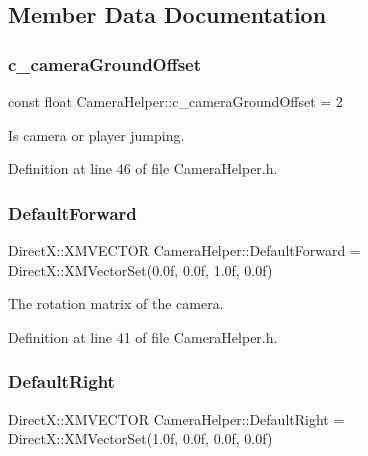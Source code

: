 \subsection{Member Data Documentation}
\mbox{\label{class_camera_helper_ac0b6f1a7975e28a7604985da3f29278b}} 
\subsubsection{\texorpdfstring{c\+\_\+camera\+Ground\+Offset}{c\_cameraGroundOffset}}
{\footnotesize\ttfamily const float Camera\+Helper\+::c\+\_\+camera\+Ground\+Offset = 2\hspace{0.3cm}{\ttfamily [private]}}



Is camera or player jumping. 



Definition at line 46 of file Camera\+Helper.\+h.

\mbox{\label{class_camera_helper_a4f5d97db4f91d138f5ea4bf4416df132}} 
\subsubsection{\texorpdfstring{Default\+Forward}{DefaultForward}}
{\footnotesize\ttfamily Direct\+X\+::\+X\+M\+V\+E\+C\+T\+OR Camera\+Helper\+::\+Default\+Forward = Direct\+X\+::\+X\+M\+Vector\+Set(0.\+0f, 0.\+0f, 1.\+0f, 0.\+0f)\hspace{0.3cm}{\ttfamily [private]}}



The rotation matrix of the camera. 



Definition at line 41 of file Camera\+Helper.\+h.

\mbox{\label{class_camera_helper_af4ca47176953088f0f18adecf7bf4409}} 
\subsubsection{\texorpdfstring{Default\+Right}{DefaultRight}}
{\footnotesize\ttfamily Direct\+X\+::\+X\+M\+V\+E\+C\+T\+OR Camera\+Helper\+::\+Default\+Right = Direct\+X\+::\+X\+M\+Vector\+Set(1.\+0f, 0.\+0f, 0.\+0f, 0.\+0f)\hspace{0.3cm}{\ttfamily [private]}}



